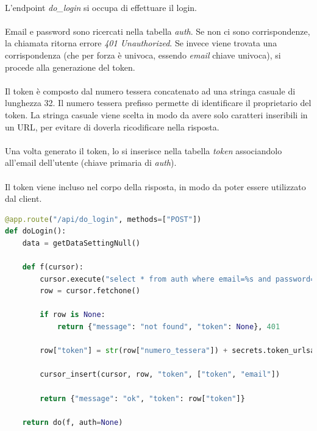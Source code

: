 \documentclass[12pt,a4paper,twoside,english,italian]{book}
\begin{document}
\paragraph{} L'endpoint \emph{do\_login} si occupa di effettuare il login.

\paragraph{} Email e password sono ricercati nella tabella \emph{auth}. Se non ci sono corrispondenze, la chiamata ritorna errore \emph{401 Unauthorized}. Se invece viene trovata una corrispondenza (che per forza è univoca, essendo \emph{email} chiave univoca), si procede alla generazione del token.

\paragraph{} Il token è composto dal numero tessera concatenato ad una stringa casuale di lunghezza 32. Il numero tessera prefisso permette di identificare il proprietario del token. La stringa casuale viene scelta in modo da avere solo caratteri inseribili in un URL, per evitare di doverla ricodificare nella risposta. 

\paragraph{} Una volta generato il token, lo si inserisce nella tabella \emph{token} associandolo all'email dell'utente (chiave primaria di \emph{auth}). 

\paragraph{} Il token viene incluso nel corpo della risposta, in modo da poter essere utilizzato dal client. 

\begin{lstlisting}[language=Python, caption=POST do\_login]
@app.route("/api/do_login", methods=["POST"])
def doLogin():
    data = getDataSettingNull()

    def f(cursor):
        cursor.execute("select * from auth where email=%s and password=%s", (data["email"], data["password"]))
        row = cursor.fetchone()

        if row is None:
            return {"message": "not found", "token": None}, 401

        row["token"] = str(row["numero_tessera"]) + secrets.token_urlsafe(32)

        cursor_insert(cursor, row, "token", ["token", "email"])

        return {"message": "ok", "token": row["token"]}

    return do(f, auth=None)
\end{lstlisting}
\end{document}
